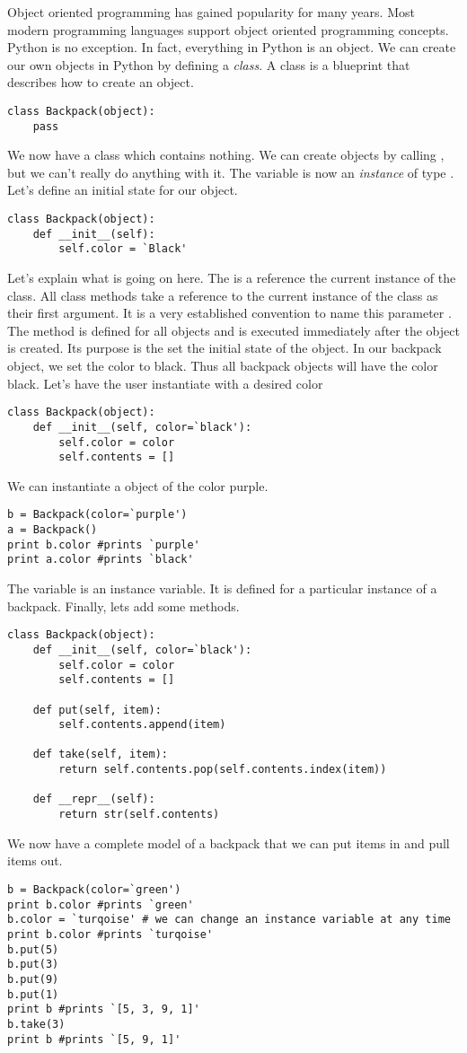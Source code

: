 Object oriented programming has gained popularity for many years.  Most modern programming languages support object oriented programming concepts.  Python is no exception.  In fact, everything in Python is an object.  We can create our own objects in Python by defining a \emph{class}.  A class is a blueprint that
describes how to create an object.
\begin{lstlisting}
class Backpack(object):
    pass
\end{lstlisting}
We now have a class  which contains nothing.  We can create  objects by
calling , but we can't really do anything with it.  The variable  is now an
\emph{instance} of type .  Let's define an initial state for our object.
\begin{lstlisting}
class Backpack(object):
    def __init__(self):
        self.color = `Black'
\end{lstlisting}
Let's explain what is going on here.  The  is a reference the current instance of the class.
All class methods take a reference to the current instance of the class as their first argument.  It is a
very established convention to name this parameter .  The  method is defined for all
objects and is executed immediately after the object is created.  Its purpose is the set the initial state
of the object.  In our backpack object, we set the color to black.  Thus all backpack objects will have the color black.
Let's have the user instantiate with a desired color
\begin{lstlisting}
class Backpack(object):
    def __init__(self, color=`black'):
        self.color = color
        self.contents = []
\end{lstlisting}
We can instantiate a  object of the color purple.
\begin{lstlisting}
b = Backpack(color=`purple')
a = Backpack()
print b.color #prints `purple'
print a.color #prints `black'
\end{lstlisting}
The variable  is an instance variable.  It is defined for a particular instance of a backpack.
Finally, lets add some methods.
\begin{lstlisting}
class Backpack(object):
    def __init__(self, color=`black'):
        self.color = color
        self.contents = []
        
    def put(self, item):
        self.contents.append(item)
        
    def take(self, item):
        return self.contents.pop(self.contents.index(item))
        
    def __repr__(self):
        return str(self.contents)
\end{lstlisting}
We now have a complete model of a backpack that we can put items in and pull items out.
\begin{lstlisting}
b = Backpack(color=`green')
print b.color #prints `green'
b.color = `turqoise' # we can change an instance variable at any time
print b.color #prints `turqoise'
b.put(5)
b.put(3)
b.put(9)
b.put(1)
print b #prints `[5, 3, 9, 1]'
b.take(3)
print b #prints `[5, 9, 1]'
\end{lstlisting}

